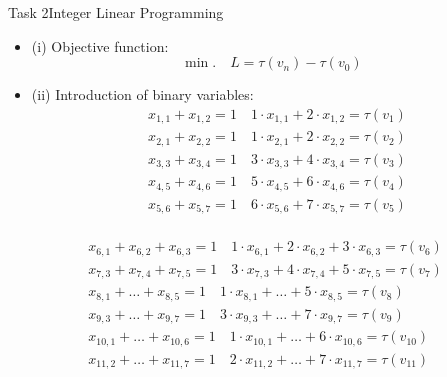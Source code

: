 \begin{frame}[allowframebreaks]{Task 2}{Integer Linear Programming}
  \begin{solutionnoinc}
    \begin{itemize}
      \item \alert{(i) Objective function:}
      \[
      \min . \quad L=\tau\left(v_n\right)-\tau\left(v_0\right)
      \]
      \item \alert{(ii) Introduction of binary variables:}
      \[
        \begin{aligned}
        & x_{1,1}+x_{1,2}=1 \quad 1 \cdot x_{1,1}+2 \cdot x_{1,2}=\tau\left(v_1\right) \\
        & x_{2,1}+x_{2,2}=1 \quad 1 \cdot x_{2,1}+2 \cdot x_{2,2}=\tau\left(v_2\right) \\
        & x_{3,3}+x_{3,4}=1 \quad 3 \cdot x_{3,3}+4 \cdot x_{3,4}=\tau\left(v_3\right) \\
        & x_{4,5}+x_{4,6}=1 \quad 5 \cdot x_{4,5}+6 \cdot x_{4,6}=\tau\left(v_4\right) \\
        & x_{5,6}+x_{5,7}=1 \quad 6 \cdot x_{5,6}+7 \cdot x_{5,7}=\tau\left(v_5\right) \\
        \end{aligned}
      \]
    \end{itemize}
  \end{solutionnoinc}
  \framebreak
  \begin{solutionnoinc}
      \[
      \begin{aligned}
        & x_{6,1}+x_{6,2}+x_{6,3}=1 \quad 1 \cdot x_{6,1}+2 \cdot x_{6,2}+3 \cdot x_{6,3}=\tau\left(v_6\right) \\
        & x_{7,3}+x_{7,4}+x_{7,5}=1 \quad 3 \cdot x_{7,3}+4 \cdot x_{7,4}+5 \cdot x_{7,5}=\tau\left(v_7\right) \\
        & x_{8,1}+\ldots+x_{8,5}=1 \quad 1 \cdot x_{8,1}+\ldots+5 \cdot x_{8,5}=\tau\left(v_8\right) \\
        & x_{9,3}+\ldots+x_{9,7}=1 \quad 3 \cdot x_{9,3}+\ldots+7 \cdot x_{9,7}=\tau\left(v_9\right) \\
        & x_{10,1}+\ldots+x_{10,6}=1 \quad 1 \cdot x_{10,1}+\ldots+6 \cdot x_{10,6}=\tau\left(v_{10}\right) \\
        & x_{11,2}+\ldots+x_{11,7}=1 \quad 2 \cdot x_{11,2}+\ldots+7 \cdot x_{11,7}=\tau\left(v_{11}\right) \\
      \end{aligned}
      \]
  \end{solutionnoinc}
  \begin{solutionnoinc}

\end{solutionnoinc}
\end{frame}
